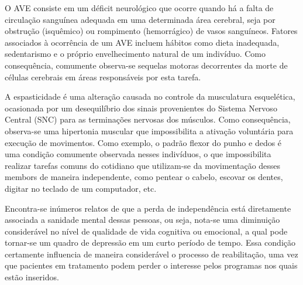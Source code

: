 \documentclass[rascunho,xindy]{fei}
\begin{document}
O AVE consiste em um déficit neurológico que ocorre quando há a falta de circulação sanguínea adequada em uma determinada área cerebral, seja por obstrução (isquêmico) ou rompimento (hemorrágico) de vasos sanguíneos. Fatores associados à ocorrência de um AVE incluem hábitos como dieta inadequada, sedentarismo e o próprio envelhecimento natural de um indivíduo. Como consequência, comumente observa-se sequelas motoras decorrentes da morte de células cerebrais em áreas responsáveis por esta tarefa. 

A espasticidade é uma alteração causada no controle da musculatura esquelética, ocasionada por um desequilíbrio dos sinais provenientes do  Sistema Nervoso Central (SNC) para as terminações nervosas dos músculos. Como consequência, observa-se uma hipertonia muscular que impossibilita a ativação voluntária para execução de movimentos. Como exemplo, o padrão flexor do punho e dedos é uma condição comumente observada nesses indivíduos, o que impossibilita realizar tarefas comuns do cotidiano que utilizam-se da movimentação desses membors de maneira independente, como pentear o cabelo, escovar os dentes, digitar no teclado de um computador, etc. 

Encontra-se inúmeros relatos de que a perda de independência está diretamente associada a sanidade mental dessas pessoas, ou seja, nota-se uma diminuição considerável no nível de qualidade de vida cognitiva ou emocional, a qual pode tornar-se um quadro de depressão em um curto período de tempo. Essa condição certamente influencia de maneira considerável o processo de reabilitação, uma vez que pacientes em tratamento podem perder o interesse pelos programas nos quais estão inseridos. 



%
\end{document}

